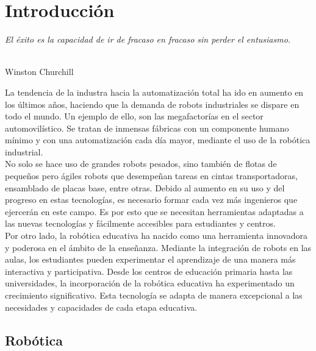 \chapter{Introducción}
\label{cap:capitulo1}
\setcounter{page}{1}

\begin{flushright}
\begin{minipage}[]{10cm}
\emph{El éxito es la capacidad de ir de fracaso en fracaso sin perder el entusiasmo.}\\
\end{minipage}\\

Winston Churchill\\
\end{flushright}

\vspace{1cm}

La tendencia de la industra hacia la automatización total ha ido en aumento en los últimos años, 
haciendo que la demanda de robots industriales se dispare en todo el mundo. Un ejemplo de ello, son 
las megafactorías en el sector automovilístico. Se tratan de inmensas fábricas con un componente humano
mínimo y con una automatización cada día mayor, mediante el uso de la robótica industrial. \\No solo se hace
uso de grandes robots pesados, sino también de flotas de pequeños pero ágiles robots que desempeñan tareas
en cintas transportadoras, ensamblado de placas base, entre otras.  Debido al aumento en su uso y del progreso 
en estas tecnologías, es necesario formar cada vez más ingenieros que ejercerán en este campo. Es por esto que se 
necesitan herramientas adaptadas a las nuevas tecnologías y fácilmente accesibles para estudiantes y centros.    \\
Por otro lado, la robótica educativa ha nacido como una herramienta innovadora y poderosa en el ámbito de la 
enseñanza. Mediante la integración de robots en las aulas, los estudiantes pueden experimentar el 
aprendizaje de una manera más interactiva y participativa. Desde los centros de educación primaria hasta las 
universidades, la incorporación de la robótica educativa ha experimentado un crecimiento significativo. Esta 
tecnología se adapta de manera excepcional a las necesidades y capacidades de cada etapa educativa.

\section{Robótica}
\label{sec:robotica}


